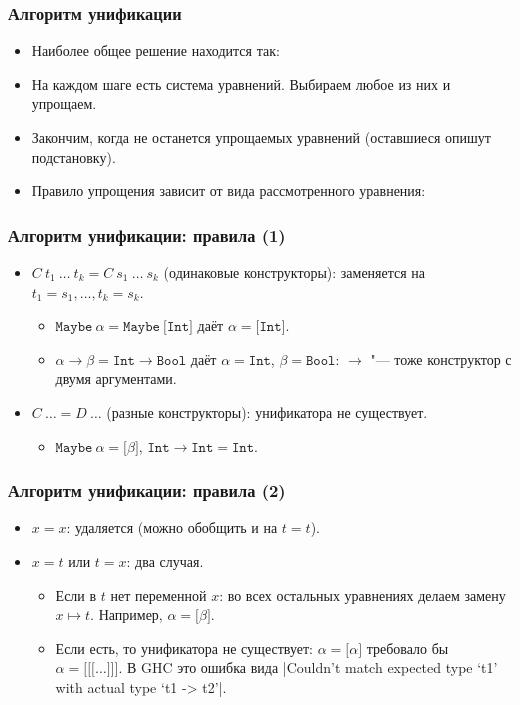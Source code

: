 \documentclass[11pt]{beamer}
\newcommand{\lst}[1]{\mathtt{[}#1\mathtt{]}}
\newcommand{\tInt}{\mathtt{Int}}
\newcommand{\tBool}{\mathtt{Bool}}
\newcommand{\tMaybe}{\mathtt{Maybe}}
\begin{document}
\begin{frame}[fragile]
  \frametitle{Алгоритм унификации}
  \begin{itemize}
    \item Наиболее общее решение находится так:
          \pause
    \item На каждом шаге есть система уравнений. Выбираем любое из них и упрощаем.
    \item Закончим, когда не останется упрощаемых уравнений (оставшиеся опишут подстановку).
    \item Правило упрощения зависит от вида рассмотренного уравнения:
  \end{itemize}
\end{frame}

\begin{frame}[fragile]
  \frametitle{Алгоритм унификации: правила (1)}
  \begin{itemize}
    \item $C~t_1~\ldots~t_k = C~s_1~\ldots~s_k$ (одинаковые конструкторы): \pause заменяется на $t_1 = s_1, \ldots, t_k = s_k$.
          \pause
          \begin{itemize}
            \item $\tMaybe~\alpha = \tMaybe~\lst{\tInt}$ даёт $\alpha = \lst{\tInt}$.
            \item $\alpha \to \beta = \tInt \to \tBool$ даёт $\alpha = \tInt$, $\beta = \tBool$: $\to$ "--- тоже конструктор с двумя аргументами.
          \end{itemize}
          \pause
    \item $C~\ldots = D~\ldots$ (разные конструкторы): \pause унификатора не существует.
          \pause
          \begin{itemize}
            \item $\tMaybe~\alpha = \lst{\beta}$, $\tInt \to \tInt = \tInt$.
          \end{itemize}
  \end{itemize}
\end{frame}

\begin{frame}[fragile]
  \frametitle{Алгоритм унификации: правила (2)}
  \begin{itemize}
    \item $x=x$: \pause удаляется (можно обобщить и на $t=t$).
          \pause
    \item $x=t$ или $t=x$: два случая. \pause
          \begin{itemize}
            \item Если в $t$ нет переменной $x$: \pause во всех остальных уравнениях делаем замену $x \mapsto t$. Например, $\alpha = \lst{\beta}$.
            \item Если есть\pause, то унификатора не существует: $\alpha = \lst{\alpha}$ требовало бы $\alpha = \mathtt{[[[}\ldots\mathtt{]]]}$. В GHC это ошибка вида \ghcinline|Couldn't match expected type ‘t1’ with actual type ‘t1 -> t2’|.
          \end{itemize}
  \end{itemize}
\end{frame}
\end{document}
